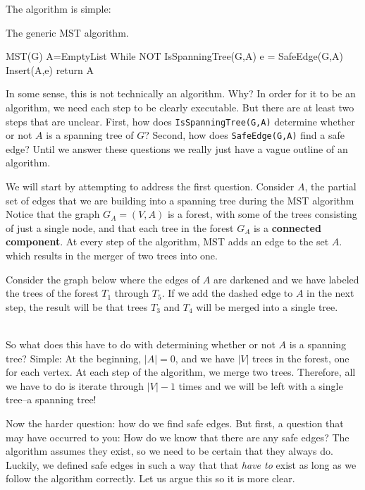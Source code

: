 The algorithm is simple:
\begin{proc}
The generic MST algorithm.
\begin{code}
MST(G)
 A=EmptyList
 While NOT IsSpanningTree(G,A) 
     e = SafeEdge(G,A)
     Insert(A,e)
 return A
\end{code}
\end{proc}

In some sense, this is not technically an algorithm. Why?
In order for it to be an algorithm, we need each step to be
clearly executable. But there are at least two steps that are
unclear. First, how does \verb+IsSpanningTree(G,A)+ determine whether
or not $A$ is a spanning tree of $G$?
Second, how does \verb+SafeEdge(G,A)+ find a safe edge?
Until we answer these questions we really just have a vague outline
of an algorithm. 

We will start by attempting to address the first question.
Consider $A$, the partial set of edges
that we are building into a spanning tree during the MST algorithm
Notice that the graph $G_A=(V,A)$ is a forest, with some of the
trees consisting of just a single node, 
and that each tree in the forest $G_A$ is a {\bf connected component}.
At every step of the algorithm, MST adds an edge to the set $A$.
which results in the merger of two trees into one.

\begin{exa}
Consider the graph below where the edges of $A$ are darkened
and we have labeled the trees of the forest $T_1$ through $T_5$.
If we add the dashed edge to $A$ in the next step, the result will
be that trees $T_3$ and $T_4$ will be merged into a single tree.\\

\ \ \ \ \ \ 
\end{exa}

So what does this have to do with determining whether or not 
$A$ is a spanning tree? Simple: At the beginning, 
$|A|=0$, and we have $|V|$ trees in the forest, one for each vertex.
At each step of the algorithm, we merge two trees. Therefore, 
all we have to do is iterate through $|V|-1$ times and we will be left
with a single tree--a spanning tree!

Now the harder question: how do we find safe edges. But first,
a question that may have occurred to you: 
How do we know that there are any safe edges? 
The algorithm assumes they exist,
so we need to be certain that they always do. 
Luckily, we defined safe edges in such a way that that {\em have to}
exist as long as we follow the algorithm correctly. 
Let us argue this so it is more clear. 

